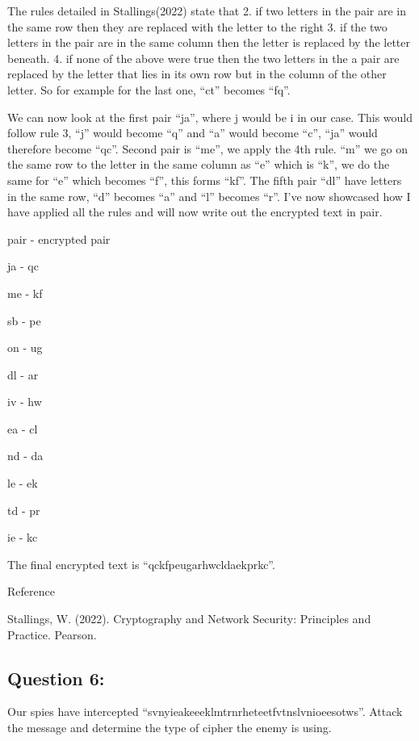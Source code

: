 \documentclass[11pt]{article}
\begin{document}
The rules detailed in Stallings(2022) state that 2. if two letters in
the pair are in the same row then they are replaced with the letter to
the right 3. if the two letters in the pair are in the same column then
the letter is replaced by the letter beneath. 4. if none of the above
were true then the two letters in the a pair are replaced by the letter
that lies in its own row but in the column of the other letter. So for
example for the last one, ``ct'' becomes ``fq''.

We can now look at the first pair ``ja'', where j would be i in our
case. This would follow rule 3, ``j'' would become ``q'' and ``a'' would
become ``c'', ``ja'' would therefore become ``qc''. Second pair is
``me'', we apply the 4th rule. ``m'' we go on the same row to the letter
in the same column as ``e'' which is ``k'', we do the same for ``e''
which becomes ``f'', this forms ``kf''. The fifth pair ``dl'' have
letters in the same row, ``d'' becomes ``a'' and ``l'' becomes ``r''.
I've now showcased how I have applied all the rules and will now write
out the encrypted text in pair.

pair - encrypted pair

ja - qc

me - kf

sb - pe

on - ug

dl - ar

iv - hw

ea - cl

nd - da

le - ek

td - pr

ie - kc

The final encrypted text is ``qckfpeugarhwcldaekprkc''.

Reference

Stallings, W. (2022). Cryptography and Network Security: Principles and
Practice. Pearson.

    \hypertarget{question-6}{%
\subsection{Question 6:}\label{question-6}}

Our spies have intercepted
``svnyieakeeeklmtrnrheteetfvtnslvnioeesotws''. Attack the message and
determine the type of cipher the enemy is using.
\end{document}

